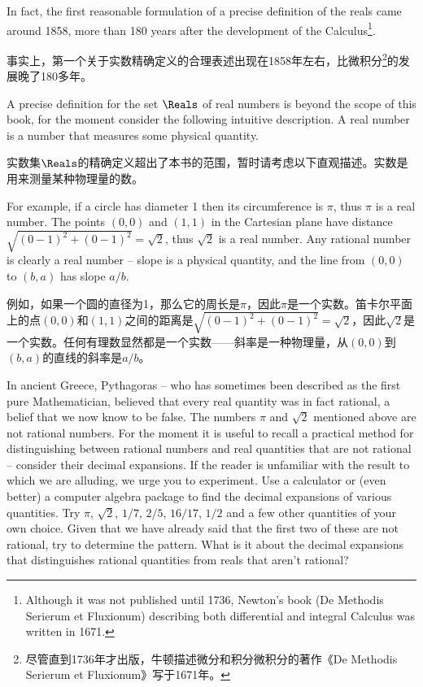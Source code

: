 In fact, the first reasonable formulation of a
precise definition of the reals came around 1858, more than 180 years
after the development of the 
Calculus\footnote{Although it was not
  published until 1736, Newton's book (De Methodis Serierum et
  Fluxionum) describing both differential and integral Calculus was
  written in 1671.}.

事实上，第一个关于实数精确定义的合理表述出现在1858年左右，比微积分\footnote{尽管直到1736年才出版，牛顿描述微分和积分微积分的著作《De Methodis Serierum et Fluxionum》写于1671年。}的发展晚了180多年。

A precise 
definition for the set $\Reals$ of real numbers is 
beyond the scope of this book, for the moment consider the
following intuitive description. A real number is a number that 
measures some physical quantity.

实数集$\Reals$的精确定义超出了本书的范围，暂时请考虑以下直观描述。实数是用来测量某种物理量的数。

For example, if a circle has
diameter 1 then its circumference is $\pi$, thus $\pi$ is a real
number. The points $(0,0)$ and $(1,1)$ in the Cartesian plane have
distance $\sqrt{ (0-1)^2 + (0-1)^2} = \sqrt{2}$, thus $\sqrt{2}$ is 
a real number. Any rational number is clearly a real number -- slope
is a physical quantity, and the line from $(0,0)$ to $(b,a)$ has slope
$a/b$.

例如，如果一个圆的直径为1，那么它的周长是$\pi$，因此$\pi$是一个实数。笛卡尔平面上的点$(0,0)$和$(1,1)$之间的距离是$\sqrt{ (0-1)^2 + (0-1)^2} = \sqrt{2}$，因此$\sqrt{2}$是一个实数。任何有理数显然都是一个实数——斜率是一种物理量，从$(0,0)$到$(b,a)$的直线的斜率是$a/b$。

In ancient Greece, Pythagoras -- who has sometimes been
described as the first pure Mathematician, believed that 
every real quantity was in fact rational, a belief that we now know to
be false. The numbers $\pi$ and $\sqrt{2}$ mentioned above are not
rational numbers. For the moment it is useful to recall a practical
method for distinguishing between rational numbers and real quantities
that are not rational -- consider their decimal expansions. If the
reader is unfamiliar with the result to which we are alluding, we urge
you to experiment. Use a calculator or (even better) a computer
algebra package to find the decimal expansions of various quantities.
Try $\pi$, $\sqrt{2}$, $1/7$, $2/5$, $16/17$, $1/2$ and a few other
quantities of your own choice. Given that we have already said that the first
two of these are not rational, try to determine the pattern. What is 
it about the decimal expansions
that distinguishes rational quantities from reals that aren't rational?

